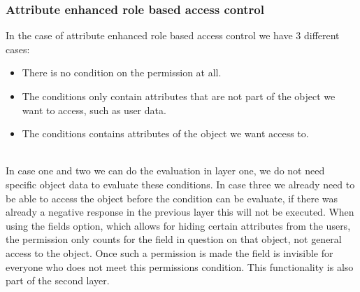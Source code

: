 \subsubsection{Attribute enhanced role based access control}
In the case of attribute enhanced role based access control we have 3 different cases:
\begin{itemize}
    \item There is no condition on the permission at all.
    \item The conditions only contain attributes that are not part of the object we want to access, such as user data.
    \item The conditions contains attributes of the object we want access to.
\end{itemize}
\\
In case one and two we can do the evaluation in layer one, we do not need specific object data to evaluate these conditions.
In case three we already need to be able to access the object before the condition can be evaluate, if there was already a negative response in the previous layer this will not be executed.
When using the fields option, which allows for hiding certain attributes from the users, the permission only counts for the field in question on that object, not general access to the object.
Once such a permission is made the field is invisible for everyone who does not meet this permissions condition.
This functionality is also part of the second layer.


